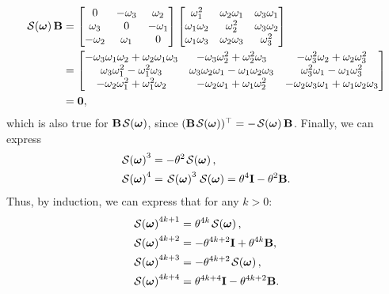 \begin{align}
    \SL[\boldsymbol{\omega}]\mathbf{B} &= \begin{bmatrix}
        0 & -\omega_3 & \omega_2\\
        \omega_3 & 0 & -\omega_1 \\
        -\omega_2 & \omega_1 & 0
    \end{bmatrix}\begin{bmatrix}
        \omega_1^2 & \omega_2\omega_1 & \omega_3\omega_1\\
        \omega_1\omega_2 & \omega_2^2 & \omega_3\omega_2 \\
        \omega_1\omega_3 & \omega_2\omega_3 & \omega_3^2
    \end{bmatrix}\\
    &= \begin{bmatrix}
        -\omega_3\omega_1\omega_2 + \omega_2\omega_1\omega_3 & -\omega_3\omega_2^2+\omega_2^2\omega_3 & -\omega_3^2\omega_2 + \omega_2\omega_3^2\\
        \omega_3\omega_1^2-\omega_1^2\omega_3 & \omega_3\omega_2\omega_1 - \omega_1\omega_2\omega_3 & \omega_3^2\omega_1 - \omega_1\omega_3^2\\
        -\omega_2\omega_1^2 + \omega_1^2\omega_2 & -\omega_2\omega_1 + \omega_1\omega_2^2 & -\omega_2\omega_3\omega_1 + \omega_1\omega_2\omega_3
    \end{bmatrix}\\
    &=\mathbf{0},
\end{align}
which is also true for $\mathbf{B}\SL[\boldsymbol{\omega}]$, since $(\mathbf{B}\SL[\boldsymbol{\omega}])^\top=-\SL[\boldsymbol{\omega}]\mathbf{B}$. Finally, we can express
\begin{align}
    \SL[\boldsymbol{\omega}]^3 &= -\theta^2\SL[\boldsymbol{\omega}],\\
    \SL[\boldsymbol{\omega}]^4 &= \SL[\boldsymbol{\omega}]^3\SL[\boldsymbol{\omega}] = \theta^4\mathbf{I} - \theta^2\mathbf{B}.
\end{align}
Thus, by induction, we can express that for any $k>0$:
\begin{align}
    \SL[\boldsymbol{\omega}]^{4k+1} &= \theta^{4k}\SL[\boldsymbol{\omega}],\\
    \SL[\boldsymbol{\omega}]^{4k+2} &= -\theta^{4k+2}\mathbf{I} + \theta^{4k}\mathbf{B},\\
    \SL[\boldsymbol{\omega}]^{4k+3} &= -\theta^{4k+2}\SL[\boldsymbol{\omega}],\\
    \SL[\boldsymbol{\omega}]^{4k+4} &= \theta^{4k+4}\mathbf{I} - \theta^{4k+2}\mathbf{B}.
\end{align}

